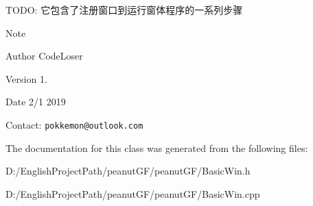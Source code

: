T\+O\+DO\+: 它包含了注册窗口到运行窗体程序的一系列步骤

\begin{DoxyNote}{Note}

\end{DoxyNote}
\begin{DoxyAuthor}{Author}
Code\+Loser
\end{DoxyAuthor}
\begin{DoxyVersion}{Version}
1.
\end{DoxyVersion}
\begin{DoxyDate}{Date}
2/1 2019
\end{DoxyDate}
Contact\+: {\tt pokkemon@outlook.\+com} 

The documentation for this class was generated from the following files\+:\begin{DoxyCompactItemize}
\item 
D\+:/\+English\+Project\+Path/peanut\+G\+F/peanut\+G\+F/Basic\+Win.\+h\item 
D\+:/\+English\+Project\+Path/peanut\+G\+F/peanut\+G\+F/Basic\+Win.\+cpp\end{DoxyCompactItemize}

